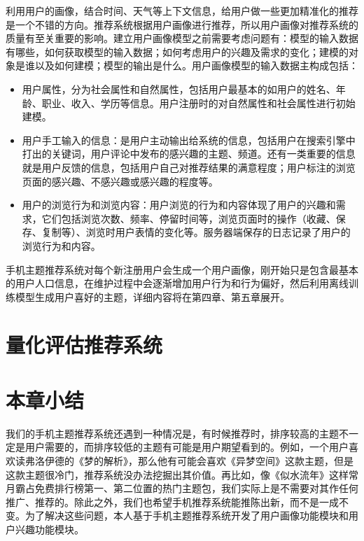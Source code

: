   利用用户的画像，结合时间、天气等上下文信息，给用户做一些更加精准化的推荐是一个不错的方向。推荐系统根据用户画像进行推荐，所以用户画像对推荐系统的质量有至关重要的影响。建立用户画像模型之前需要考虑问题有：模型的输入数据有哪些，如何获取模型的输入数据；如何考虑用户的兴趣及需求的变化；建模的对象是谁以及如何建模；模型的输出是什么。用户画像模型的输入数据主构成包括：
  \begin{itemize}
  \item 用户属性，分为社会属性和自然属性，包括用户最基本的如用户的姓名、年龄、职业、收入、学历等信息。用户注册时的对自然属性和社会属性进行初始建模。 
  \item 用户手工输入的信息：是用户主动输出给系统的信息，包括用户在搜索引擎中打出的关键词，用户评论中发布的感兴趣的主题、频道。还有一类重要的信息就是用户反馈的信息，包括用户自己对推荐结果的满意程度；用户标注的浏览页面的感兴趣、不感兴趣或感兴趣的程度等。
  \item 用户的浏览行为和浏览内容：用户浏览的行为和内容体现了用户的兴趣和需求，它们包括浏览次数、频率、停留时间等，浏览页面时的操作（收藏、保存、复制等）、浏览时用户表情的变化等。服务器端保存的日志记录了用户的浏览行为和内容。
  \end{itemize}

  手机主题推荐系统对每个新注册用户会生成一个用户画像，刚开始只是包含最基本的用户人口信息，在维护过程中会逐渐增加用户行为和行为偏好，然后利用离线训练模型生成用户喜好的主题，详细内容将在第四章、第五章展开。
  \section{量化评估推荐系统}
  

  \section{本章小结}
  我们的手机主题推荐系统还遇到一种情况是，有时候推荐时，排序较高的主题不一定是用户需要的，而排序较低的主题有可能是用户期望看到的。例如，一个用户喜欢读弗洛伊德的《梦的解析》，那么他有可能会喜欢《异梦空间》这款主题，但是这款主题很冷门，推荐系统没办法挖掘出其价值。再比如，像《似水流年》这样常月霸占免费排行榜第一、第二位置的热门主题包，我们实际上是不需要对其作任何推广、推荐的。除此之外，我们也希望手机推荐系统能推陈出新，而不是一成不变。为了解决这些问题，本人基于手机主题推荐系统开发了用户画像功能模块和用户兴趣功能模块。